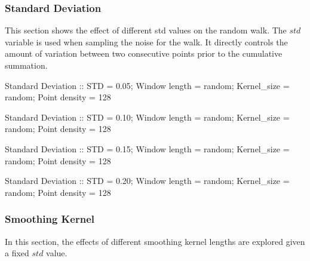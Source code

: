 \documentclass[AMA,LATO1COL]{WileyNJD-v2}
\begin{document}
\subsubsection{Standard Deviation}\label{baseline:standard-deviation}
This section shows the effect of different std values on the random walk. The \(std\) variable is used when sampling the noise for the walk. It directly controls the amount of variation between two consecutive points prior to the cumulative summation.

\begin{center}
    \newpage 
Standard Deviation :: STD = 0.05; Window length = random; Kernel\_size = random; Point density = 128


    \begin{center}
    \end{center}

    
    \newpage

Standard Deviation :: STD = 0.10; Window length = random; Kernel\_size = random; Point density = 128


    \begin{center}
    \end{center}

    
    \newpage 
Standard Deviation :: STD = 0.15; Window length = random; Kernel\_size = random; Point density = 128


    \begin{center}
    \end{center}

    
    \newpage 
Standard Deviation :: STD = 0.20; Window length = random; Kernel\_size = random; Point density = 128


    \begin{center}
    \end{center}

\end{center}
    
\newpage
\subsubsection{Smoothing Kernel}\label{baseline:smoothing-kernel}
In this section, the effects of different smoothing kernel lengths are explored given a fixed $std$ value.
\end{document}
